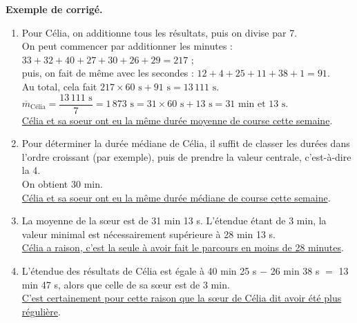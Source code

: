 \begin{activite}
   \bigskip
   
   \textcolor{G1}{
   {\bf Exemple de corrigé.} \smallskip
      \begin{enumerate}
         \item Pour Célia, on additionne tous les résultats, puis on divise par 7. \\
            On peut commencer par additionner les minutes : $33+32+40+27+30+26+29 =217$ ; \\
            puis, on fait de même avec les secondes : $12+4+25+11+38+1 =91$. \\
            Au total, cela fait $217\times60\text{ s}+91\text{ s} =13\,111\text{ s}$. \\ [1mm]
            $\overline{m}_{\text{Célia}} =\dfrac{13\,111\text{ s}}{7} =1\,873\text{ s} =31\times60\text{ s}+13\text{ s} =31\text{ min et } 13\text{ s}$. \\ [1mm]
            \uline{Célia et sa soeur ont eu la même durée moyenne de course cette semaine}.
         \item Pour déterminer la durée médiane de Célia, il suffit de classer les durées dans l'ordre croissant (par exemple), puis de prendre la valeur centrale, c'est-à-dire la 4. \\
            On obtient 30 min. \\
            \uline{Célia et sa soeur ont eu la même durée médiane de course cette semaine}.
         \item La moyenne de la s\oe ur est de 31 min 13 s. L'étendue étant de 3 min, la valeur minimal est nécessairement supérieure à 28 min 13 s. \\
            \uline{Célia a raison, c'est la seule à avoir fait le parcours en moins de 28 minutes}.
         \item L'étendue des résultats de Célia est égale à 40 min 25 s $-$ 26 min 38 s $=$ 13 min 47 s, alors que celle de sa s\oe ur est de 3 min. \\
            \uline{C'est certainement pour cette raison que la s\oe ur de Célia dit avoir été plus régulière}.
      \end{enumerate}}
\end{activite}


\exercicesbase

